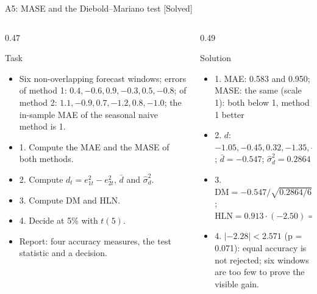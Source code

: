 \begin{frame}{A5: MASE and the Diebold--Mariano test [Solved]}
\itemsize{\scriptsize}
\begin{columns}[T]
\begin{column}{0.47\textwidth}
\begin{block}{Task}
\begin{itemize}
    \item Six non-overlapping forecast windows; errors of method 1: $0.4, -0.6, 0.9, -0.3, 0.5, -0.8$; of method 2: $1.1, -0.9, 0.7, -1.2, 0.8, -1.0$; the in-sample MAE of the seasonal naive method is 1.
    \item 1. Compute the MAE and the MASE of both methods.
    \item 2. Compute $d_t = e_{1t}^2 - e_{2t}^2$, $\bar d$ and $\hat\sigma_d^2$.
    \item 3. Compute DM and HLN.
    \item 4. Decide at 5\% with $t(5)$.
    \item Report: four accuracy measures, the test statistic and a decision.
\end{itemize}
\end{block}
\end{column}
\begin{column}{0.49\textwidth}
\begin{exampleblock}{Solution}
\begin{itemize}
    \item 1. MAE: 0.583 and 0.950; MASE: the same (scale 1): both below 1, method 1 better
    \item 2. $d$: $-1.05, -0.45, 0.32, -1.35, -0.39, -0.36$; $\bar d = -0.547$; $\hat\sigma_d^2 = 0.2864$
    \item 3. $\mathrm{DM} = -0.547/\sqrt{0.2864/6} = -2.50$; $\mathrm{HLN} = 0.913 \cdot (-2.50) = -2.28$
    \item 4. $|-2.28| < 2.571$ (p = 0.071): equal accuracy is not rejected; six windows are too few to prove the visible gain.
\end{itemize}
\end{exampleblock}
\end{column}
\end{columns}
\end{frame}

